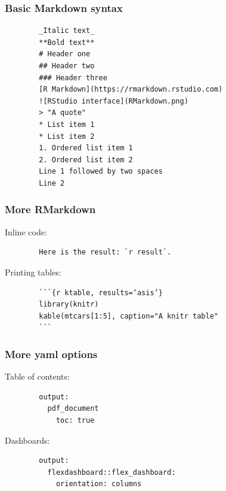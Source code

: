 \documentclass{beamer}
\begin{document}
	\begin{frame}[fragile]
		\frametitle{Basic Markdown syntax}

		\begin{exampleblock}{}
		\begin{BVerbatim}
		_Italic text_
		**Bold text**
		# Header one
		## Header two
		### Header three
		[R Markdown](https://rmarkdown.rstudio.com)
		![RStudio interface](RMarkdown.png)
		> "A quote"
		* List item 1
		* List item 2
		1. Ordered list item 1
		2. Ordered list item 2
		Line 1 followed by two spaces  
		Line 2 
		\end{BVerbatim}
		\end{exampleblock}{}

	\end{frame}

	\begin{frame}[fragile]
		\frametitle{More RMarkdown}

		Inline code:
		\begin{exampleblock}{}
		\begin{BVerbatim}
		Here is the result: `r result`.
		\end{BVerbatim}
		\end{exampleblock}{}

		\vspace{1em}

		Printing tables:
		\begin{exampleblock}{}
		\begin{BVerbatim}
		```{r ktable, results=‘asis’}
		library(knitr)
		kable(mtcars[1:5], caption="A knitr table"
		```
		\end{BVerbatim}
		\end{exampleblock}{}

	\end{frame}

	\begin{frame}[fragile]
		\frametitle{More yaml options}

		Table of contents:
		\begin{exampleblock}{}
		\begin{BVerbatim}
		output:
		  pdf_document
		    toc: true
		\end{BVerbatim}
		\end{exampleblock}{}

		\vspace{1em}

		Dashboards:
		\begin{exampleblock}{}
		\begin{BVerbatim}
		output:
		  flexdashboard::flex_dashboard:
		    orientation: columns
		\end{BVerbatim}
		\end{exampleblock}{}

	\end{frame}
	
\end{document}
